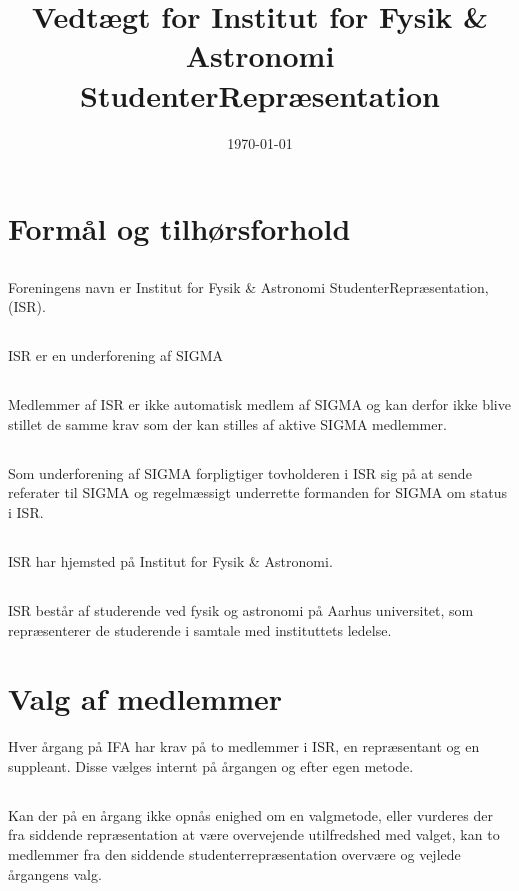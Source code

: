 \documentclass[danish,a4paper,twocolumn]{article}
\newcommand{\foreningen}{Institut for Fysik \& Astronomi StudenterRepræsentation}
\begin{document}
\title{\vspace{-2ex}Vedtægt for \foreningen\vspace{-5ex}}
\date{\today}
\maketitle

\section{Formål og tilhørsforhold}
\subsection{}Foreningens navn er \foreningen, (ISR).
\subsection{}\label{stk:sigma} 
ISR er en underforening af SIGMA
\subsection{}
Medlemmer af ISR er ikke automatisk medlem af SIGMA og kan derfor ikke blive stillet de samme krav som der kan stilles af aktive SIGMA medlemmer.
\subsection{}
Som underforening af SIGMA forpligtiger tovholderen i ISR sig på at sende referater til SIGMA og regelmæssigt underrette formanden for SIGMA om status i ISR.
\subsection{}ISR har hjemsted på Institut for Fysik \& Astronomi.
\subsection{}ISR består af studerende ved fysik og astronomi på Aarhus universitet, som repræsenterer de studerende i samtale med instituttets ledelse.
\section{Valg af medlemmer}
Hver årgang på IFA har krav på to medlemmer i ISR, en repræsentant og en suppleant. Disse vælges internt på årgangen og efter egen metode.
\subsection{}
Kan der på en årgang ikke opnås enighed om en valgmetode, eller vurderes der fra siddende repræsentation at være overvejende utilfredshed med valget, kan to medlemmer fra den siddende studenterrepræsentation overvære og vejlede årgangens valg.
\end{document}
